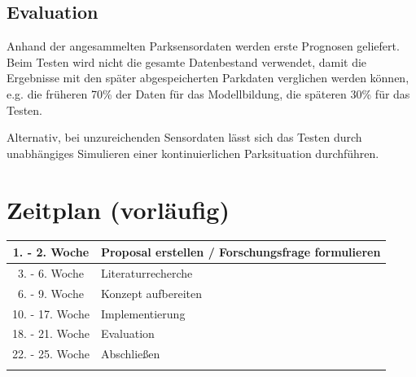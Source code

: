 \documentclass{article}
\begin{document}
\subsection{Evaluation}
Anhand der angesammelten Parksensordaten werden erste Prognosen geliefert. Beim Testen wird nicht die gesamte Datenbestand verwendet, damit die Ergebnisse mit den sp\"ater abgespeicherten Parkdaten verglichen werden k\"onnen, e.g. die fr\"uheren 70\% der Daten f\"ur das Modellbildung, die sp\"ateren 30\% f\"ur das Testen.

\vspace{2mm}
Alternativ, bei unzureichenden Sensordaten l\"asst sich das Testen durch unabh\"angiges Simulieren einer kontinuierlichen Parksituation durchf\"uhren.

\section{Zeitplan (vorl\"aufig)}

\begin{table}[!ht]
 \centering
  \begin{tabular}{|c|l|}
  \hline
  	1. - 2. Woche & Proposal erstellen / Forschungsfrage formulieren \\ \hline
  	3. - 6. Woche & Literaturrecherche \\ \hline
  	6. - 9. Woche & Konzept aufbereiten \\ \hline
  	10. - 17. Woche & Implementierung \\ \hline
  	18. - 21. Woche & Evaluation \\ \hline
  	22. - 25.  Woche & Abschlie\ss{}en \\ \hline
  	& \\ \hline
  \end{tabular}
\end{table}

\nocite{*}

\printbibliography
\end{document}
